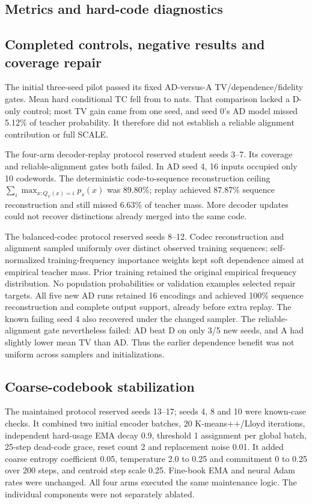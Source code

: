 \subsection{Metrics and hard-code diagnostics}


\subsection{Completed controls, negative results and coverage repair}
\StudyResultsTable
The initial three-seed pilot passed its fixed AD-versus-A TV/dependence/fidelity
gates. Mean hard conditional TC fell from \PilotTCAlignment{} to
\PilotTCCombined{} nats. That comparison lacked a D-only control; most TV gain
came from one seed, and seed 0's AD model missed 5.12\% of teacher probability.
It therefore did not establish a reliable alignment contribution or full SCALE.

The four-arm decoder-replay protocol reserved student seeds 3--7. Its coverage
and reliable-alignment gates both failed. In AD seed 4, 16 inputs occupied only
10 codewords. The deterministic code-to-sequence reconstruction ceiling
\(\sum_i\max_{x:Q_\psi(x)=i}p_s(x)\) was 89.80\%; replay achieved 87.87\%
sequence reconstruction and still missed 6.63\% of teacher mass. More decoder
updates could not recover distinctions already merged into the same code.

The balanced-codec protocol reserved seeds 8--12. Codec reconstruction and
alignment sampled uniformly over distinct observed training sequences;
self-normalized training-frequency importance weights kept soft dependence
aimed at empirical teacher mass. Prior training retained the original empirical
frequency distribution. No population probabilities or validation examples
selected repair targets. All five new AD runs retained 16 encodings and achieved
100\% sequence reconstruction and complete output support, already before extra
replay. The known failing seed 4 also recovered under the changed sampler.
The reliable-alignment gate nevertheless failed: AD beat D on only 3/5 new seeds,
and A had slightly lower mean TV than AD. Thus the earlier dependence benefit
was not uniform across samplers and initializations.

\subsection{Coarse-codebook stabilization}
The maintained protocol reserved seeds 13--17; seeds 4, 8 and 10 were known-case
checks. It combined two initial encoder batches, 20 K-means++/Lloyd iterations,
independent hard-usage EMA decay 0.9, threshold 1 assignment per global batch,
25-step dead-code grace, reset count 2 and replacement noise 0.01.
It added coarse entropy coefficient 0.05, temperature 2.0 to 0.25 and commitment
0 to 0.25 over 200 steps, and centroid step scale 0.25. Fine-book EMA and neural
Adam rates were unchanged. All four arms executed the same maintenance logic.
The individual components were not separately ablated.

